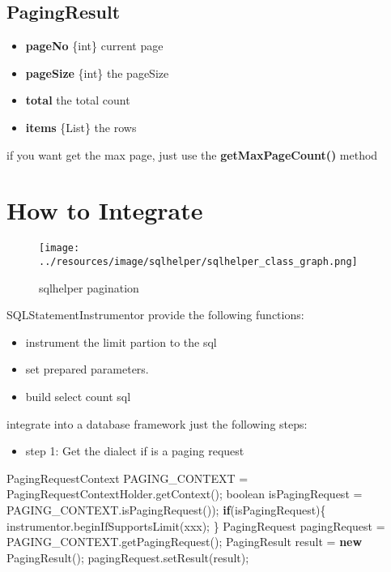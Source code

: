 \documentclass[
]{book}
\newenvironment{Shaded}{\begin{snugshade}}{\end{snugshade}}
\newcommand{\DataTypeTok}[1]{\textcolor[rgb]{0.13,0.29,0.53}{#1}}
\newcommand{\FunctionTok}[1]{\textcolor[rgb]{0.00,0.00,0.00}{#1}}
\newcommand{\KeywordTok}[1]{\textcolor[rgb]{0.13,0.29,0.53}{\textbf{#1}}}
\newcommand{\NormalTok}[1]{#1}
\providecommand{\tightlist}{%
  \setlength{\itemsep}{0pt}\setlength{\parskip}{0pt}}
\begin{document}
\hypertarget{pagingresult}{%
\subsection{PagingResult}\label{pagingresult}}

\begin{itemize}
\tightlist
\item
  \textbf{pageNo} \{int\} current page
\item
  \textbf{pageSize} \{int\} the pageSize
\item
  \textbf{total} the total count
\item
  \textbf{items} \{List\} the rows
\end{itemize}

if you want get the max page, just use the \textbf{getMaxPageCount()} method

\hypertarget{pagination_how_to_integrate}{%
\section{How to Integrate}\label{pagination_how_to_integrate}}

\begin{figure}
\centering
\texttt{[image: ../resources/image/sqlhelper/sqlhelper\_class\_graph.png]}
\caption{sqlhelper pagination}
\end{figure}

SQLStatementInstrumentor provide the following functions:

\begin{itemize}
\tightlist
\item
  instrument the limit partion to the sql
\item
  set prepared parameters.
\item
  build select count sql
\end{itemize}

integrate into a database framework just the following steps:

\begin{itemize}
\tightlist
\item
  step 1: Get the dialect if is a paging request
\end{itemize}

\begin{Shaded}
\begin{Highlighting}[]
\NormalTok{PagingRequestContext PAGING_CONTEXT = PagingRequestContextHolder.}\FunctionTok{getContext}\NormalTok{();}
\DataTypeTok{boolean}\NormalTok{ isPagingRequest = PAGING_CONTEXT.}\FunctionTok{isPagingRequest}\NormalTok{());}
\KeywordTok{if}\NormalTok{(isPagingRequest)\{}
\NormalTok{    instrumentor.}\FunctionTok{beginIfSupportsLimit}\NormalTok{(xxx);}
\NormalTok{\}}
\NormalTok{PagingRequest pagingRequest = PAGING_CONTEXT.}\FunctionTok{getPagingRequest}\NormalTok{();}
\NormalTok{PagingResult result = }\KeywordTok{new} \FunctionTok{PagingResult}\NormalTok{();}
\NormalTok{pagingRequest.}\FunctionTok{setResult}\NormalTok{(result);}
\end{Highlighting}
\end{Shaded}
\end{document}
